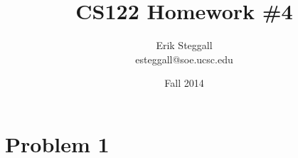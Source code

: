 \documentclass{article}
\title{CS122 Homework \#4}
\author{Erik Steggall \\ esteggall@soe.ucsc.edu}
\date{Fall 2014}
\begin{document}
 \maketitle \pagestyle{empty}
\section*{Problem 1}
\end{document}
